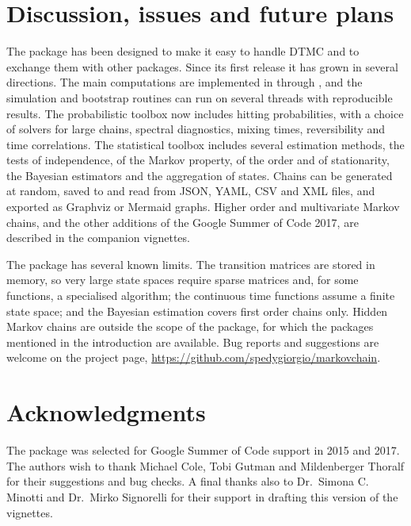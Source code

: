 \documentclass[
  nojss]{jss}
\begin{document}
\section{Discussion, issues and future plans}\label{sec:discussion}

The  package has been designed to make it easy to handle DTMC and to exchange them with other packages. Since its first release it has grown in several directions. The main computations are implemented in  through  \citep{RcppR}, and the simulation and bootstrap routines can run on several threads with reproducible results. The probabilistic toolbox now includes hitting probabilities, with a choice of solvers for large chains, spectral diagnostics, mixing times, reversibility and time correlations. The statistical toolbox includes several estimation methods, the tests of independence, of the Markov property, of the order and of stationarity, the Bayesian estimators and the aggregation of states. Chains can be generated at random, saved to and read from JSON, YAML, CSV and XML files, and exported as Graphviz or Mermaid graphs. Higher order and multivariate Markov chains, and the other additions of the Google Summer of Code 2017, are described in the companion vignettes.

The package has several known limits. The transition matrices are stored in memory, so very large state spaces require sparse matrices and, for some functions, a specialised algorithm; the continuous time functions assume a finite state space; and the Bayesian estimation covers first order chains only. Hidden Markov chains are outside the scope of the package, for which the packages mentioned in the introduction are available. Bug reports and suggestions are welcome on the project page, \url{https://github.com/spedygiorgio/markovchain}.

\section{Acknowledgments}\label{sec:aknowledgements}

The package was selected for Google Summer of Code support in 2015 and 2017. The authors wish to thank Michael Cole, Tobi Gutman and Mildenberger Thoralf for their suggestions and bug checks. A final thanks also to Dr.~Simona C. Minotti and Dr.~Mirko Signorelli for their support in drafting this version of the vignettes.

\clearpage

\renewcommand\refname{References}

\end{document}
